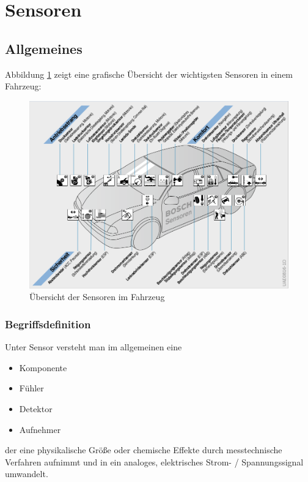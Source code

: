 \graphicspath{{./Images/Kapitel5/}}

	\section{Sensoren}
		\subsection{Allgemeines} 
		
		Abbildung \ref{fig:TS01} zeigt eine grafische Übersicht der wichtigsten Sensoren in einem Fahrzeug:
				
		\begin{figure}[h!]
			\includegraphics[width=\textwidth] {sensor_uebersicht.png}
	        \caption{Übersicht der Sensoren im Fahrzeug \cite{BP01}}
	        \label{fig:TS01}
		\end{figure}	
		
			\subsubsection{Begriffsdefinition}
		
	        Unter Sensor versteht man im allgemeinen eine
	        \begin{itemize}
	            \item Komponente
	            \item Fühler
	            \item Detektor
	            \item Aufnehmer
	        \end{itemize}
	            der eine physikalische Größe oder chemische Effekte durch messtechnische Verfahren aufnimmt und in ein analoges, elektrisches Strom- / Spannungssignal umwandelt.
	        
